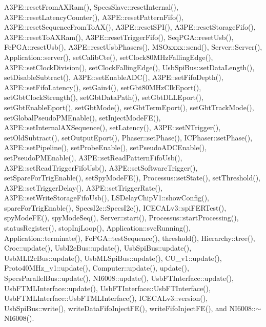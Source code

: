 A3\+P\+E\+::reset\+From\+A\+X\+Ram(), Specs\+Slave\+::reset\+Internal(), A3\+P\+E\+::reset\+Latency\+Counter(), A3\+P\+E\+::reset\+Pattern\+Fifo(), A3\+P\+E\+::reset\+Sequence\+From\+To\+A\+X(), A3\+P\+E\+::reset\+S\+P\+I(), A3\+P\+E\+::reset\+Storage\+Fifo(), A3\+P\+E\+::reset\+To\+A\+X\+Ram(), A3\+P\+E\+::reset\+Trigger\+Fifo(), Seq\+P\+G\+A\+::reset\+Usb(), Fe\+P\+G\+A\+::reset\+Usb(), A3\+P\+E\+::reset\+Usb\+Phasers(), M\+S\+Oxxxx\+::send(), Server\+::\+Server(), Application\+::server(), set\+Calib\+Cte(), set\+Clock80\+M\+Hz\+Falling\+Edge(), A3\+P\+E\+::set\+Clock\+Division(), set\+Clock\+Falling\+Edge(), Usb\+Spi\+Bus\+::set\+Data\+Length(), set\+Disable\+Subtract(), A3\+P\+E\+::set\+Enable\+A\+D\+C(), A3\+P\+E\+::set\+Fifo\+Depth(), A3\+P\+E\+::set\+Fifo\+Latency(), set\+Gain4(), set\+Gbt80\+M\+Hz\+Clk\+Eport(), set\+Gbt\+Clock\+Strength(), set\+Gbt\+Data\+Path(), set\+Gbt\+D\+L\+L\+Eport(), set\+Gbt\+Enable\+Eport(), set\+Gbt\+Mode(), set\+Gbt\+Term\+Eport(), set\+Gbt\+Track\+Mode(), set\+Global\+Pseudo\+P\+M\+Enable(), set\+Inject\+Mode\+F\+E(), A3\+P\+E\+::set\+Internal\+A\+X\+Sequence(), set\+Latency(), A3\+P\+E\+::set\+N\+Trigger(), set\+Old\+Subtract(), set\+Output\+Eport(), Phaser\+::set\+Phase(), I\+C\+Phaser\+::set\+Phase(), A3\+P\+E\+::set\+Pipeline(), set\+Probe\+Enable(), set\+Pseudo\+A\+D\+C\+Enable(), set\+Pseudo\+P\+M\+Enable(), A3\+P\+E\+::set\+Read\+Pattern\+Fifo\+Usb(), A3\+P\+E\+::set\+Read\+Trigger\+Fifo\+Usb(), A3\+P\+E\+::set\+Software\+Trigger(), set\+Spare\+For\+Trig\+Enable(), set\+Spy\+Mode\+F\+E(), Processus\+::set\+State(), set\+Threshold(), A3\+P\+E\+::set\+Trigger\+Delay(), A3\+P\+E\+::set\+Trigger\+Rate(), A3\+P\+E\+::set\+Write\+Storage\+Fifo\+Usb(), L\+S\+Delay\+Chip\+V1\+::show\+Config(), spare\+For\+Trig\+Enable(), Specs\+I2c\+::\+Specs\+I2c(), I\+C\+E\+C\+A\+Lv3\+::spi\+F\+E\+R\+Test(), spy\+Mode\+F\+E(), spy\+Mode\+Seq(), Server\+::start(), Processus\+::start\+Processing(), status\+Register(), stop\+Inj\+Loop(), Application\+::svc\+Running(), Application\+::terminate(), Fe\+P\+G\+A\+::test\+Sequence(), threshold(), Hierarchy\+::tree(), Croc\+::update(), Usb\+I2c\+Bus\+::update(), Usb\+Spi\+Bus\+::update(), Usb\+M\+L\+I2c\+Bus\+::update(), Usb\+M\+L\+Spi\+Bus\+::update(), C\+U\+\_\+v1\+::update(), Proto40\+M\+Hz\+\_\+v1\+::update(), Computer\+::update(), update(), Specs\+Parallel\+Bus\+::update(), N\+I6008\+::update(), Usb\+F\+T\+Interface\+::update(), Usb\+F\+T\+M\+L\+Interface\+::update(), Usb\+F\+T\+Interface\+::\+Usb\+F\+T\+Interface(), Usb\+F\+T\+M\+L\+Interface\+::\+Usb\+F\+T\+M\+L\+Interface(), I\+C\+E\+C\+A\+Lv3\+::version(), Usb\+Spi\+Bus\+::write(), write\+Data\+Fifo\+Inject\+F\+E(), write\+Fifo\+Inject\+F\+E(), and N\+I6008\+::$\sim$\+N\+I6008().


